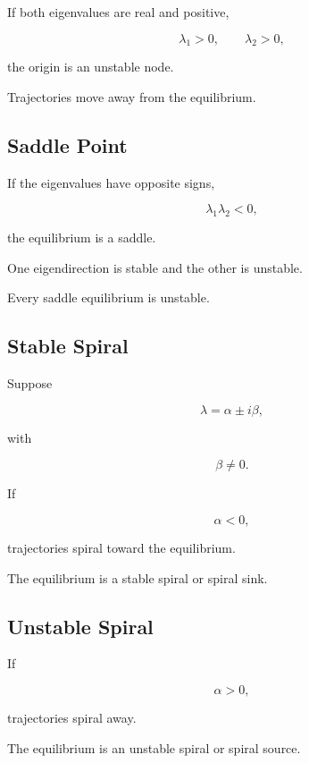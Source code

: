 If both eigenvalues are real and positive,

\[
\boxed{
\lambda_1>0,
\qquad
\lambda_2>0,
}
\]

the origin is an unstable node.

Trajectories move away from the equilibrium.

\subsection{Saddle Point}
\label{subsec:dynamical-saddle}

If the eigenvalues have opposite signs,

\[
\boxed{
\lambda_1\lambda_2<0,
}
\]

the equilibrium is a saddle.

One eigendirection is stable and the other is unstable.

Every saddle equilibrium is unstable.

\subsection{Stable Spiral}
\label{subsec:stable-spiral}

Suppose

\[
\lambda
=
\alpha
\pm
i\beta,
\]

with

\[
\beta\neq0.
\]

If

\[
\boxed{
\alpha<0,
}
\]

trajectories spiral toward the equilibrium.

The equilibrium is a stable spiral or spiral sink.

\subsection{Unstable Spiral}
\label{subsec:unstable-spiral}

If

\[
\boxed{
\alpha>0,
}
\]

trajectories spiral away.

The equilibrium is an unstable spiral or spiral source.

